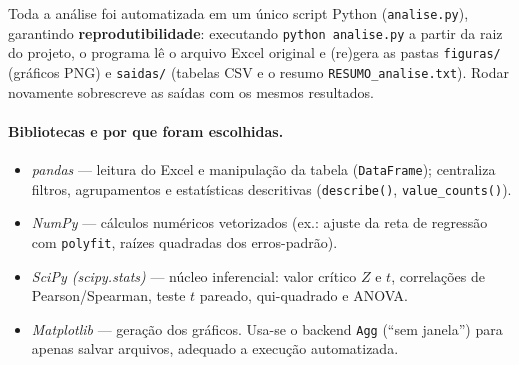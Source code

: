 \documentclass[a4paper, 12pt]{article}
\newcommand{\var}[1]{\texttt{#1}}
\begin{document}
Toda a análise foi automatizada em um único script Python (\var{analise.py}),
garantindo \textbf{reprodutibilidade}: executando \var{python analise.py} a
partir da raiz do projeto, o programa lê o arquivo Excel original e
(re)gera as pastas \var{figuras/} (gráficos PNG) e \var{saidas/} (tabelas CSV e o
resumo \var{RESUMO\_analise.txt}). Rodar novamente sobrescreve as saídas com os
mesmos resultados.

\paragraph{Bibliotecas e por que foram escolhidas.}
\begin{itemize}[noitemsep]
	\item \emph{pandas} --- leitura do Excel e manipulação da tabela
	      (\texttt{DataFrame}); centraliza filtros, agrupamentos e estatísticas
	      descritivas (\texttt{describe()}, \texttt{value\_counts()}).
	\item \emph{NumPy} --- cálculos numéricos vetorizados (ex.: ajuste da reta de
	      regressão com \texttt{polyfit}, raízes quadradas dos erros-padrão).
	\item \emph{SciPy (scipy.stats)} --- núcleo inferencial: valor crítico $Z$ e
	      $t$, correlações de Pearson/Spearman, teste $t$ pareado, qui-quadrado e
	      ANOVA.
	\item \emph{Matplotlib} --- geração dos gráficos. Usa-se o backend
	      \texttt{Agg} (``sem janela'') para apenas salvar arquivos, adequado a
	      execução automatizada.
\end{itemize}
\end{document}
